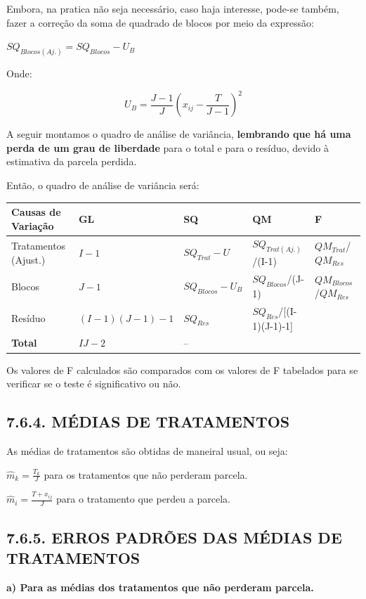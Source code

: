 \documentclass[
]{book}
\begin{document}
Embora, na pratica não seja necessário, caso haja interesse, pode-se também, fazer a correção da soma de quadrado de blocos por meio da expressão:

\(SQ_{Blocos(Aj.)}=SQ_{Blocos}-U_B\)

Onde:

\[
U_B=\frac{J-1}{J}\left(x_{ij}-\frac{T}{J-1}\right)^2
\]

A seguir montamos o quadro de análise de variância, \textbf{lembrando que há uma perda de um grau de liberdade} para o total e para o resíduo, devido à estimativa da parcela perdida.

Então, o quadro de análise de variância será:

\begin{longtable}[]{@{}lllll@{}}
\toprule
Causas de Variação & GL & SQ & QM & F\tabularnewline
\midrule
\endhead
Tratamentos (Ajust.) & \(I-1\) & \(SQ_{Trat}-U\) & \(SQ_{Trat(Aj.)}\)/(I-1) & \(QM_{Trat}\)/\(QM_{Res}\)\tabularnewline
Blocos & \(J-1\) & \(SQ_{Blocos}-U_B\) & \(SQ_{Blocos}\)/(J-1) & \(QM_{Blocos}\)/\(QM_{Res}\)\tabularnewline
Resíduo & \((I-1)(J-1)-1\) & \(SQ_{Res}\) & \(SQ_{Res}\)/{[}(I-1)(J-1)-1{]} &\tabularnewline
\textbf{Total} & \textbf{\(IJ-2\)} & -- & &\tabularnewline
\bottomrule
\end{longtable}

Os valores de F calculados são comparados com os valores de F tabelados para se verificar se o teste é significativo ou não.

\hypertarget{muxe9dias-de-tratamentos}{%
\subsection{7.6.4. MÉDIAS DE TRATAMENTOS}\label{muxe9dias-de-tratamentos}}

As médias de tratamentos são obtidas de maneiral usual, ou seja:

\(\hat{m}_k=\frac{T_k}{J}\) para os tratamentos que não perderam parcela.

\(\hat{m}_i=\frac{T+x_{ij}}{J}\) para o tratamento que perdeu a parcela.

\hypertarget{erros-padruxf5es-das-muxe9dias-de-tratamentos}{%
\subsection{7.6.5. ERROS PADRÕES DAS MÉDIAS DE TRATAMENTOS}\label{erros-padruxf5es-das-muxe9dias-de-tratamentos}}

\textbf{a) Para as médias dos tratamentos que não perderam parcela.}
\end{document}
